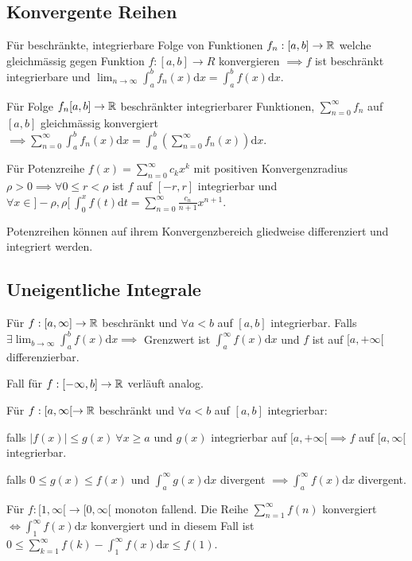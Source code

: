 \subsection{Konvergente Reihen}
\begin{compactitem}
    \item Für beschränkte, integrierbare Folge von Funktionen $f_n: [a,b] \to \mathbb{R}$ welche gleichmässig gegen Funktion $f:[a,b] \to R$ konvergieren $\implies f$ ist beschränkt integrierbare und $\lim_{n \to \infty} \int_{a}^{b} f_n(x) \mathrm{d}x = \int_{a}^{b} f(x) \mathrm{d}x$.
    \item Für Folge $f_n [a,b] \to \mathbb{R}$ beschränkter integrierbarer Funktionen, $\sum_{n=0}^{\infty} f_n$ auf $[a,b]$ gleichmässig konvergiert $\implies \sum_{n=0}^{\infty} \int_{a}^{b} f_n(x) \mathrm{d}x = \int_{a}^{b} \left( \sum_{n=0}^{\infty} f_n(x) \right) \mathrm{d}x$.
    \item Für Potenzreihe $f(x) = \sum_{n=0}^{\infty} c_kx^k$ mit positiven Konvergenzradius $\rho > 0 \implies \forall 0 \le r < \rho$ ist $f$ auf $[-r, r]$ integrierbar und $\forall x \in ]-\rho, \rho[ \ \int_{0}^{x} f(t) \mathrm{d}t = \sum_{n=0}^{\infty} \frac{c_n}{n + 1} x^{n+1}$.
        \begin{compactitem}
            \item Potenzreihen können auf ihrem Konvergenzbereich gliedweise differenziert und integriert werden.
        \end{compactitem}
\end{compactitem}


\subsection{Uneigentliche Integrale}
Für $f: [a, \infty] \to \mathbb{R}$ beschränkt und $\forall a < b$ auf $[a,b]$ integrierbar. Falls $\exists \lim_{b \to \infty} \int_{a}^{b} f(x) \mathrm{d}x \implies$ Grenzwert ist $\int_{a}^{\infty} f(x) \mathrm{d}x$ und $f$ ist auf $[a, +\infty[$ differenzierbar.
\begin{compactitem}
    \item Fall für $f:[-\infty, b] \to \mathbb{R}$ verläuft analog.
    \item Für $f:[a, \infty[ \to \mathbb{R}$ beschränkt und $\forall a < b$ auf $[a,b]$ integrierbar:
        \begin{compactitem}
            \item falls $|f(x)| \le g(x) \ \forall x \ge a$ und $g(x)$ integrierbar auf $[a, +\infty[ \implies f$ auf $[a, \infty[$ integrierbar.
            \item falls $0 \le g(x) \le f(x)$ und $\int_{a}^{\infty} g(x) \mathrm{d}x$ divergent $\implies \int_{a}^{\infty} f(x) \mathrm{d}x$ divergent.
        \end{compactitem}
    \item Für $f: [1, \infty[ \to [0, \infty[$ monoton fallend. Die Reihe $\sum_{n=1}^{\infty} f(n)$ konvergiert $\iff \int_{1}^{\infty} f(x) \mathrm{d}x$ konvergiert und in diesem Fall ist $0 \le \sum_{k=1}^{\infty} f(k) - \int_{1}^{\infty} f(x) \mathrm{d}x \le f(1)$.
\end{compactitem}
